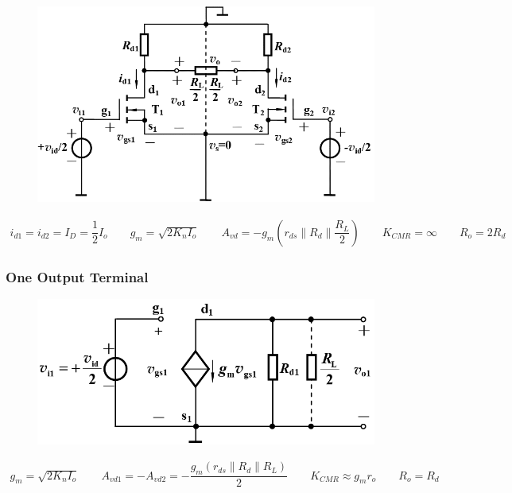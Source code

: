 \begin{figure}[H]
  \centering
    \includegraphics[width=0.7\linewidth]{figures/Differential-Amplifier-MOS-1}
\end{figure}

\begin{equation*}
  \begin{aligned}
    i_{d1} = i_{d2} = I_D = \dfrac{1}{2} I_o \quad\quad g_m = \sqrt{2 K_n I_o} \quad\quad A_{vd} = - g_m \left( r_{ds} \parallel R_d \parallel \dfrac{R_L}{2}  \right) \quad\quad K_{CMR} = \infty \quad\quad R_o = 2 R_d
  \end{aligned}
\end{equation*}

\subsubsection{One Output Terminal}

\begin{figure}[H]
  \centering
    \includegraphics[width=0.7\linewidth]{figures/Differential-Amplifier-MOS-2}
\end{figure}

\begin{equation*}
  \begin{aligned}
    g_m = \sqrt{2 K_n I_o} \quad\quad A_{vd1} = - A_{vd2} = - \dfrac{g_m \left( r_{ds} \parallel R_d \parallel R_L \right) }{2} \quad\quad K_{CMR} \approx g_m r_o \quad\quad R_o = R_d
  \end{aligned}
\end{equation*}

